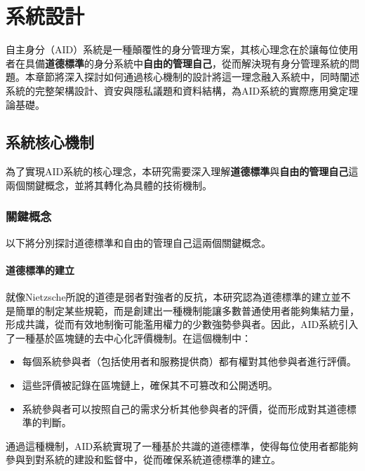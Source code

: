 
\chapter{系統設計}
自主身分（AID）系統是一種顛覆性的身分管理方案，其核心理念在於讓每位使用者在具備\textbf{道德標準}的身分系統中\textbf{自由的管理自己}，從而解決現有身分管理系統的問題。本章節將深入探討如何通過核心機制的設計將這一理念融入系統中，同時闡述系統的完整架構設計、資安與隱私議題和資料結構，為AID系統的實際應用奠定理論基礎。
\section{系統核心機制}
為了實現AID系統的核心理念，本研究需要深入理解\textbf{道德標準}與\textbf{自由的管理自己}這兩個關鍵概念，並將其轉化為具體的技術機制。
\subsection{關鍵概念}
以下將分別探討道德標準和自由的管理自己這兩個關鍵概念。
\subsubsection{道德標準的建立}
就像Nietzsche所說的道德是弱者對強者的反抗，本研究認為道德標準的建立並不是簡單的制定某些規範，而是創建出一種機制能讓多數普通使用者能夠集結力量，形成共識，從而有效地制衡可能濫用權力的少數強勢參與者。因此，AID系統引入了一種基於區塊鏈的去中心化評價機制。在這個機制中：
\begin{itemize}
  \item 每個系統參與者（包括使用者和服務提供商）都有權對其他參與者進行評價。
  \item 這些評價被記錄在區塊鏈上，確保其不可篡改和公開透明。
  \item 系統參與者可以按照自己的需求分析其他參與者的評價，從而形成對其道德標準的判斷。
\end{itemize}
通過這種機制，AID系統實現了一種基於共識的道德標準，使得每位使用者都能夠參與到對系統的建設和監督中，從而確保系統道德標準的建立。
